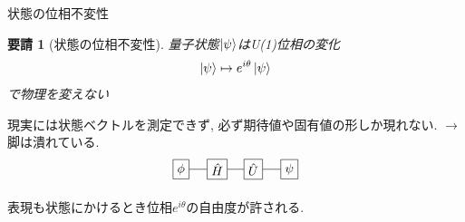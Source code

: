 \documentclass[dvipdfm]{beamer}
\newtheorem*{requirement}{要請}
\newtheorem*{them}{定理}
\newtheorem*{defn}{定義}
\newtheorem*{exmpl}{例}
\begin{document}
\begin{frame}{状態の位相不変性}
    \begin{requirement}[状態の位相不変性]
        量子状態$\ket{\psi}$はU(1)位相の変化
        \begin{equation*}
            \ket{\psi}\mapsto e^{i\theta}\ket{\psi}
        \end{equation*}
        で物理を変えない
    \end{requirement}
    現実には状態ベクトルを測定できず, 必ず期待値や固有値の形しか現れない. 
    $\rightarrow$脚は潰れている. 
    \begin{equation*}
        \begin{tikzpicture}
            \node at(0,0)[draw,rectangle](H){$\hat{H}$};
            \node at(-1,0)[draw,rectangle](f){$\phi$};
            \node at(1,0)[draw,rectangle](U){$\hat{U}$};
            \node at(2,0)[draw,rectangle](y){$\psi$};
            \draw(f.east)--(H.west)(H.east)--(U.west)(U.east)--(y.west);
        \end{tikzpicture}
    \end{equation*}

    表現も状態にかけるとき位相$e^{i\theta}$の自由度が許される. 
\end{frame}


\end{document}
